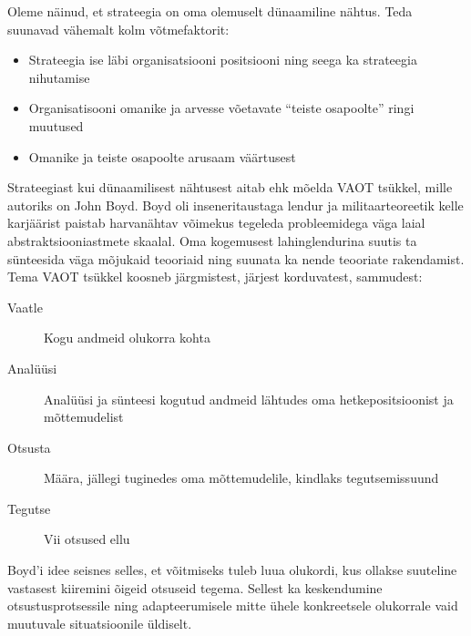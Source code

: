 \documentclass{tufte-book}
\begin{document}
Oleme näinud, et strateegia on oma olemuselt dünaamiline nähtus. Teda suunavad vähemalt kolm võtmefaktorit:
\begin{itemize}
	\item Strateegia ise läbi organisatsiooni positsiooni ning seega ka strateegia nihutamise
	\item Organisatisooni omanike ja arvesse võetavate \enquote{teiste osapoolte} ringi muutused
	\item Omanike ja teiste osapoolte arusaam väärtusest
\end{itemize}

Strateegiast kui dünaamilisest nähtusest aitab ehk mõelda VAOT tsükkel, mille autoriks on John Boyd. Boyd oli inseneritaustaga lendur ja militaarteoreetik kelle karjäärist paistab harvanähtav võimekus tegeleda probleemidega väga laial abstraktsiooniastmete skaalal. Oma kogemusest lahinglendurina suutis ta sünteesida väga mõjukaid teooriaid ning suunata ka nende teooriate rakendamist. Tema VAOT tsükkel koosneb järgmistest, järjest korduvatest, sammudest:
\begin{description}
	\item[Vaatle] Kogu andmeid olukorra kohta
	\item[Analüüsi] Analüüsi ja sünteesi kogutud andmeid lähtudes oma hetkepositsioonist ja mõttemudelist
	\item[Otsusta] Määra, jällegi tuginedes oma mõttemudelile, kindlaks tegutsemissuund
	\item[Tegutse] Vii otsused ellu
\end{description}

Boyd'i idee seisnes selles, et võitmiseks tuleb luua olukordi, kus ollakse suuteline vastasest kiiremini õigeid otsuseid tegema. Sellest ka keskendumine otsustusprotsessile ning adapteerumisele mitte ühele konkreetsele olukorrale vaid muutuvale situatsioonile üldiselt.
\end{document}
